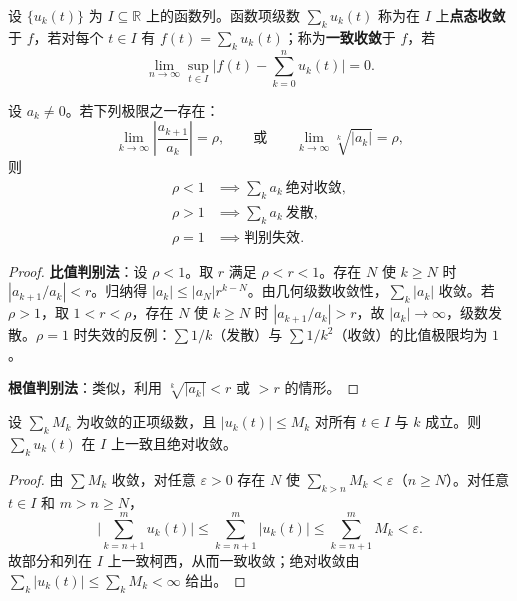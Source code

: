 \begin{definition}[函数项级数与一致收敛]\label{def:series_of_functions}
设 $\{u_k(t)\}$ 为 $I \subseteq \mathbb{R}$ 上的函数列。函数项级数 $\sum_k u_k(t)$ 称为在 $I$ 上\textbf{点态收敛}于 $f$，若对每个 $t \in I$ 有 $f(t) = \sum_k u_k(t)$；称为\textbf{一致收敛}于 $f$，若
\[
\lim_{n \to \infty} \sup_{t \in I} \Big| f(t) - \sum_{k=0}^{n} u_k(t) \Big| = 0.
\]
\end{definition}

\begin{proposition}[比值判别法与根值判别法]\label{prop:ratio_root_tests}
设 $a_k \neq 0$。若下列极限之一存在：
\[
\lim_{k\to\infty} \left| \frac{a_{k+1}}{a_k} \right| = \rho,
\qquad\text{或}\qquad
\lim_{k\to\infty} \sqrt[k]{|a_k|} = \rho,
\]
则
\[
\begin{aligned}
\rho < 1 &\implies \sum_k a_k \ \text{绝对收敛}, \\
\rho > 1 &\implies \sum_k a_k \ \text{发散}, \\
\rho = 1 &\implies \text{判别失效}.
\end{aligned}
\]
\end{proposition}

\begin{proof}
\textbf{比值判别法}：设 $\rho < 1$。取 $r$ 满足 $\rho < r < 1$。存在 $N$ 使 $k \ge N$ 时 $|a_{k+1}/a_k| < r$。归纳得 $|a_k| \le |a_N| r^{k-N}$。由几何级数收敛性，$\sum_k |a_k|$ 收敛。若 $\rho > 1$，取 $1 < r < \rho$，存在 $N$ 使 $k \ge N$ 时 $|a_{k+1}/a_k| > r$，故 $|a_k| \to \infty$，级数发散。$\rho = 1$ 时失效的反例：$\sum 1/k$（发散）与 $\sum 1/k^2$（收敛）的比值极限均为 $1$。

\textbf{根值判别法}：类似，利用 $\sqrt[k]{|a_k|} < r$ 或 $> r$ 的情形。
\end{proof}

\begin{theorem}\label{thm:weierstrass_mtest}
设 $\sum_k M_k$ 为收敛的正项级数，且 $|u_k(t)| \le M_k$ 对所有 $t \in I$ 与 $k$ 成立。则 $\sum_k u_k(t)$ 在 $I$ 上一致且绝对收敛。
\end{theorem}

\begin{proof}
由 $\sum M_k$ 收敛，对任意 $\varepsilon > 0$ 存在 $N$ 使 $\sum_{k>n} M_k < \varepsilon$（$n \ge N$）。对任意 $t \in I$ 和 $m > n \ge N$，
\[
\Big| \sum_{k=n+1}^{m} u_k(t) \Big| \le \sum_{k=n+1}^{m} |u_k(t)| \le \sum_{k=n+1}^{m} M_k < \varepsilon.
\]
故部分和列在 $I$ 上一致柯西，从而一致收敛；绝对收敛由 $\sum_k |u_k(t)| \le \sum_k M_k < \infty$ 给出。
\end{proof}

